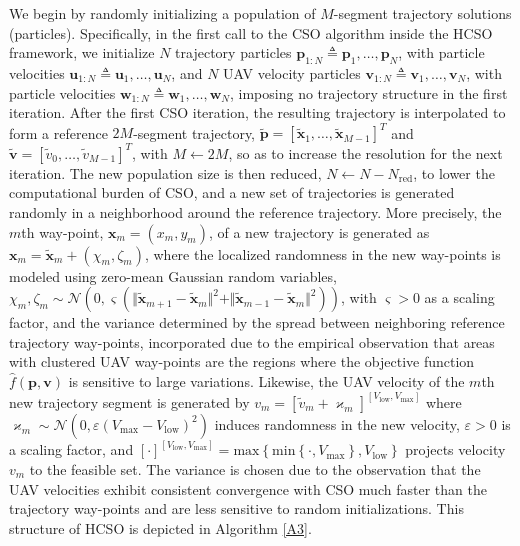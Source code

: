 \documentclass[12pt, draftcls, onecolumn]{IEEEtran}
\theoremstyle{plain}
\theoremstyle{definition}
\theoremstyle{remark}
\begin{document}
We begin by randomly initializing a population of $M$-segment trajectory solutions (particles). Specifically, in the first call to the CSO algorithm \cite{CSO} inside the HCSO framework, we initialize $N$ trajectory particles $\mathbf{p}_{1:N}{\triangleq}\mathbf{p}_{1},{\dots},\mathbf{p}_{N}$, with particle velocities $\mathbf{u}_{1:N}{\triangleq}\mathbf{u}_{1},{\dots},\mathbf{u}_{N}$, and $N$ UAV velocity particles $\mathbf{v}_{1:N}{\triangleq}\mathbf{v}_{1},{\dots},\mathbf{v}_{N}$, with particle velocities $\mathbf{w}_{1:N}{\triangleq}\mathbf{w}_{1},{\dots},\mathbf{w}_{N}$, imposing no trajectory structure in the first iteration. After the first CSO iteration, the resulting trajectory is interpolated to form a reference $2M$-segment trajectory, $\tilde{\mathbf{p}}{=}[\tilde{\mathbf{x}}_{1},{\dots},\tilde{\mathbf{x}}_{M{-}1}]^{T}$ and $\tilde{\mathbf{v}}{=}[\tilde{v}_{0},{\dots},\tilde{v}_{M{-}1}]^{T}$, with $M{\gets}2M$, so as to increase the resolution for the next iteration. The new population size is then reduced, $N{\gets}N{-}N_{\mathrm{red}}$, to lower the computational burden of CSO, and a new set of trajectories is generated randomly in a neighborhood around the reference trajectory. More precisely, the $m$th way-point, $\mathbf{x}_{m}{=}(x_{m},y_{m})$, of a new trajectory is generated as $\mathbf{x}_{m}{=}\tilde{\mathbf{x}}_{m}{+}(\chi_{m},\zeta_{m})$,
where the localized randomness in the new way-points is modeled using zero-mean Gaussian random variables, $\chi_{m},\zeta_{m}{\sim}\mathcal{N}\left(0,\varsigma\left(\Vert\tilde{\mathbf{x}}_{m{+}1}{-}\tilde{\mathbf{x}}_{m}\Vert^{2}{+}\Vert\tilde{\mathbf{x}}_{m{-}1}{-}\tilde{\mathbf{x}}_{m}\Vert^2\right)\right)$, with $\varsigma{>}0$ as a scaling factor, and the variance determined by the spread between neighboring reference trajectory way-points, incorporated due to the empirical observation that areas with clustered UAV way-points are the regions where the objective function $\hat{f}(\mathbf{p},\mathbf{v})$ is sensitive to large variations. Likewise, the UAV velocity of the $m$th new trajectory segment is generated by $v_{m}{=}[\tilde{v}_{m}{+}\varkappa_{m}]^{[V_{\mathrm{low}},V_{\mathrm{max}}]}$
where $\varkappa_{m}{\sim}\mathcal{N}\left(0,\varepsilon\left(V_{\mathrm{max}}{-}V_{\mathrm{low}}\right)^{2}\right)$ induces randomness in the new velocity, $\varepsilon{>}0$ is a scaling factor, and $[\cdot]^{[V_{\mathrm{low}},V_{\mathrm{max}}]}{=}\mathrm{max}\left\{ \mathrm{min}\left\{\cdot,V_{\mathrm{max}}\right\},V_{\mathrm{low}}\right\}$ projects velocity $v_{m}$ to the feasible set. The variance is chosen due to the observation that the UAV velocities exhibit consistent convergence with CSO much faster than the trajectory way-points and are less sensitive to random initializations. This structure of HCSO is depicted in Algorithm \ref{A3}.
\end{document}
